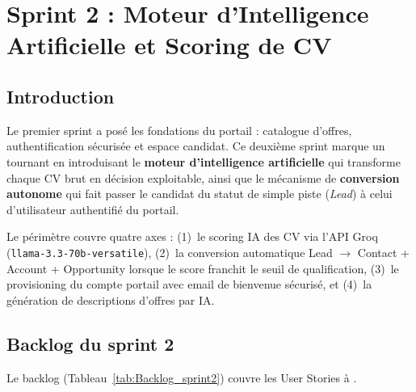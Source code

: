 \chapter{Sprint 2 : Moteur d'Intelligence Artificielle et Scoring de CV}
\label{chap:sprint2}
\setlength{\fboxsep}{1pt}
\setlength{\fboxrule}{0.4pt}

\section{Introduction}

Le premier sprint a posé les fondations du portail : catalogue d'offres, authentification sécurisée et espace candidat. Ce deuxième sprint marque un tournant en introduisant le \textbf{moteur d'intelligence artificielle} qui transforme chaque CV brut en décision exploitable, ainsi que le mécanisme de \textbf{conversion autonome} qui fait passer le candidat du statut de simple piste (\textit{Lead}) à celui d'utilisateur authentifié du portail.

\medskip

Le périmètre couvre quatre axes : (1)~le scoring IA des CV via l'API Groq
 \\
 (\texttt{llama-3.3-70b-versatile}), (2)~la conversion automatique Lead $\rightarrow$ Contact + Account + Opportunity lorsque le score franchit le seuil de qualification, (3)~le provisioning du compte portail avec email de bienvenue sécurisé, et (4)~la génération de descriptions d'offres par IA.

\section{Backlog du sprint 2}

Le backlog (Tableau~\ref{tab:Backlog_sprint2}) couvre les User Stories  à .

